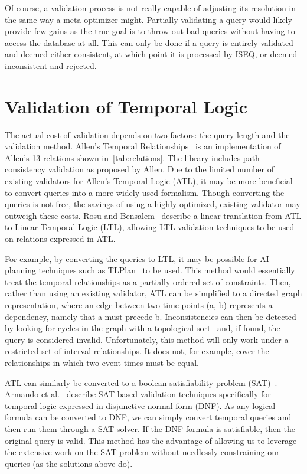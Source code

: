 \documentclass[10pt,letterpaper]{article}
\begin{document}
Of course, a validation process is not really capable of adjusting its resolution in the same way a meta-optimizer might.  Partially validating a query would likely provide few gains as the true goal is to throw out bad queries without having to access the database at all.  This can only be done if a query is entirely validated and deemed either consistent, at which point it is processed by ISEQ, or deemed inconsistent and rejected.

\section{Validation of Temporal Logic}
The actual cost of validation depends on two factors: the query length and the validation method. Allen's Temporal Relationships~\cite{Franke:2011} is an implementation of Allen's 13 relations shown in~\ref{tab:relations}. The library includes path consistency validation as proposed by Allen.
Due to the limited number of existing validators for Allen's Temporal Logic (ATL), it may be more beneficial to convert queries into a more widely used formalism. Though converting the queries is not free, the savings of using a highly optimized, existing validator may outweigh these costs. Rosu and Bensalem~\cite{Rosu:2006} describe a linear translation from ATL to Linear Temporal Logic (LTL), allowing LTL validation techniques to be used on relations expressed in ATL. 

For example, by converting the queries to LTL, it may be possible for AI planning techniques such as TLPlan~\cite{Bacchus:1998} to be used.  This method would essentially treat the temporal relationships as a partially ordered set of constraints.  Then, rather than using an existing validator, ATL can be simplified to a directed graph representation, where an edge between two time points (a, b) represents a dependency, namely that a must precede b.  Inconsistencies can then be detected by looking for cycles in the graph with a topological sort~\cite{Pearce:2004} and, if found, the query is considered invalid.  Unfortunately, this method will only work under a restricted set of interval relationships.  It does not, for example, cover the relationships in which two event times must be equal.

ATL can similarly be converted to a boolean satisfiability problem (SAT)~\cite{Cook:1971}. Armando et al.~\cite{Armando:1999} describe SAT-based validation techniques specifically for temporal logic expressed in disjunctive normal form (DNF).  As any logical formula can be converted to DNF, we can simply convert temporal queries and then run them through a SAT solver.  If the DNF formula is satisfiable, then the original query is valid.   This method has the advantage of allowing us to leverage the extensive work on the SAT problem without needlessly constraining our queries (as the solutions above do). 
\end{document}
